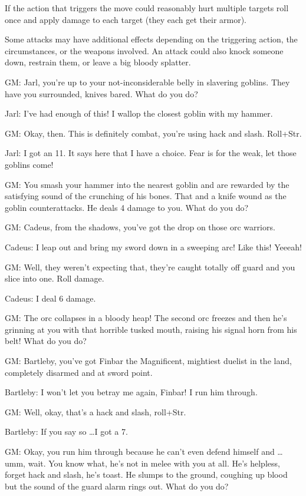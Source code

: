  If the action that triggers the move could reasonably hurt multiple targets roll once and apply damage to each target (they each get their armor).


 Some attacks may have additional effects depending on the triggering action, the circumstances, or the weapons involved. An attack could also knock someone down, restrain them, or leave a big bloody splatter.


 GM: Jarl, you're up to your not-inconsiderable belly in slavering goblins. They have you surrounded, knives bared. What do you do?


 Jarl: I've had enough of this! I wallop the closest goblin with my hammer.


 GM: Okay, then. This is definitely combat, you're using hack and slash. Roll+Str.


 Jarl: I got an 11. It says here that I have a choice. Fear is for the weak, let those goblins come!


 GM: You smash your hammer into the nearest goblin and are rewarded by the satisfying sound of the crunching of his bones. That and a knife wound as the goblin counterattacks. He deals 4 damage to you. What do you do?


 GM: Cadeus, from the shadows, you've got the drop on those orc warriors.


 Cadeus: I leap out and bring my sword down in a sweeping arc! Like this! Yeeeah!


 GM: Well, they weren't expecting that, they're caught totally off guard and you slice into one. Roll damage.


 Cadeus: I deal 6 damage.


 GM: The orc collapses in a bloody heap! The second orc freezes and then he's grinning at you with that horrible tusked mouth, raising his signal horn from his belt! What do you do?


 GM: Bartleby, you've got Finbar the Magnificent, mightiest duelist in the land, completely disarmed and at sword point.


 Bartleby: I won't let you betray me again, Finbar! I run him through.


 GM: Well, okay, that's a hack and slash, roll+Str.


 Bartleby: If you say so \ldots  I got a 7.


 GM: Okay, you run him through because he can't even defend himself and \ldots  umm, wait. You know what, he's not in melee with you at all. He's helpless, forget hack and slash, he's toast. He slumps to the ground, coughing up blood but the sound of the guard alarm rings out. What do you do?

